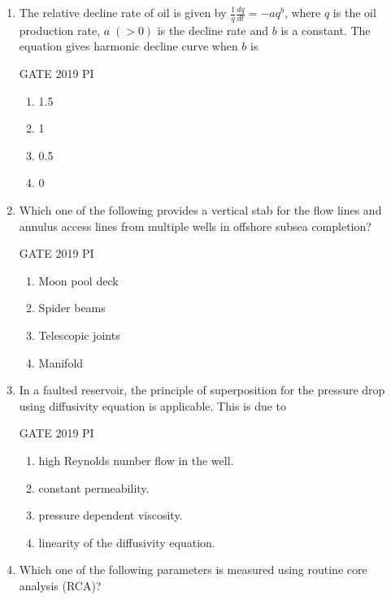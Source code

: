 \documentclass[journal,12pt,onecolumn]{IEEEtran}
\theoremstyle{remark}
\begin{document}
\begin{enumerate}
\item The relative decline rate of oil is given by $\frac{1}{q} \frac{dq}{dt} = -aq^b$, where $q$ is the oil production rate, $a\;(>0)$ is the decline rate and $b$ is a constant. The equation gives harmonic decline curve when $b$ is

\hfill{GATE 2019 PI}

\begin{multicols}{2}
\begin{enumerate}
    \item 1.5
    \item 1
    \item 0.5
    \item 0
\end{enumerate}
\end{multicols}

\item Which one of the following provides a vertical stab for the flow lines and annulus access lines from multiple wells in offshore subsea completion?

\hfill{GATE 2019 PI}

\begin{multicols}{2}
\begin{enumerate}
    \item Moon pool deck
    \item Spider beams
    \item Telescopic joints
    \item Manifold
\end{enumerate}
\end{multicols}

\item In a faulted reservoir, the principle of superposition for the pressure drop using diffusivity equation is applicable. This is due to

\hfill{GATE 2019 PI}

\begin{multicols}{2}
\begin{enumerate}
    \item high Reynolds number flow in the well.
    \item constant permeability.
    \item pressure dependent viscosity.
    \item linearity of the diffusivity equation.
\end{enumerate}
\end{multicols}

\item Which one of the following parameters is measured using routine core analysis (RCA)?


\end{enumerate}
\end{document}
